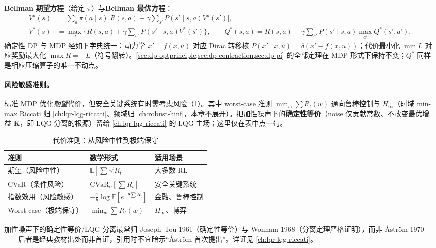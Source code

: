 \textbf{Bellman 期望方程}（给定 $\pi$）与\textbf{Bellman 最优方程}：
\begin{align}
  V^\pi(s)&=\sum_a\pi(a\mid s)\Big[R(s,a)+\gamma\sum_{s'}P(s'\mid s,a)V^\pi(s')\Big],\label{eq:dp-bellman-exp}\\
  V^*(s)&=\max_a\Big\{R(s,a)+\gamma\sum_{s'}P(s'\mid s,a)V^*(s')\Big\},\qquad
  Q^*(s,a)=R(s,a)+\gamma\sum_{s'}P(s'\mid s,a)\max_{a'}Q^*(s',a').\label{eq:dp-bellman-opt}
\end{align}
确定性 DP 与 MDP 经如下字典统一：动力学 $x'=f(x,u)$ 对应 Dirac 转移核 $P(x'\mid x,u)=\delta(x'-f(x,u))$；代价最小化 $\min L$ 对应奖励最大化 $\max R=-L$（符号翻转）。\cref{sec:dp-optprinciple,sec:dp-contraction,sec:dp-pi} 的全部定理在 MDP 形式下保持不变；$Q^*$ 同样是相应压缩算子的唯一不动点。

\paragraph{风险敏感准则。}标准 MDP 优化\emph{期望}代价，但安全关键系统有时需考虑风险（\cref{tab:dp-risk}）。其中 worst-case 准则 $\min_w\sum R_t(w)$ 通向鲁棒控制与 $H_\infty$（时域 min-max Riccati 归 \cref{ch:lqr-lqg-riccati}、频域归 \cref{ch:robust-hinf}，本章不展开）。把加性噪声下的\textbf{确定性等价}（noise 仅贡献常数、不改变最优增益 $\mathbf K$，即 LQG 分离的根源）留给 \cref{ch:lqr-lqg-riccati} 的 LQG 主场；这里仅在表中点一句。

\begin{table}[H]\centering\small
\caption{代价准则：从风险中性到极端保守}
\label{tab:dp-risk}
\begin{tabular}{lll}
\toprule
准则 & 数学形式 & 适用场景 \\
\midrule
期望（风险中性） & $\mathbb E[\sum\gamma^tR_t]$ & 大多数 RL \\
CVaR（条件风险） & $\mathrm{CVaR}_\alpha[\sum R_t]$ & 安全关键系统 \\
指数效用（风险敏感） & $-\tfrac1\theta\log\mathbb E[e^{-\theta\sum R_t}]$ & 金融、鲁棒控制 \\
Worst-case（极端保守） & $\min_w\sum R_t(w)$ & $H_\infty$、博弈 \\
\bottomrule
\end{tabular}
\end{table}

\begin{remark}[E4 勘误：确定性等价的归属]
加性噪声下的确定性等价/LQG 分离最常归 Joseph--Tou 1961（确定性等价）与 Wonham 1968（分离定理严格证明），而非 Åström 1970——后者是经典教材出处而非首证，引用时不宜暗示“Åström 首次提出”。详证见 \cref{ch:lqr-lqg-riccati}。
\end{remark}

